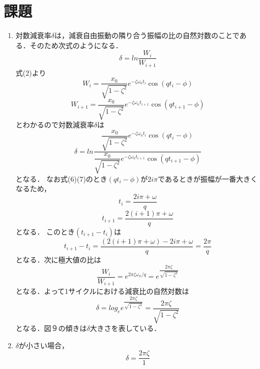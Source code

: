 \documentclass[a4paper,10.5pt]{jsarticle}
\begin{document}
\section{課題}
\begin{enumerate}
  \item 
対数減衰率$\delta$は，減衰自由振動の隣り合う振幅の比の自然対数のことである．そのため次式のようになる．
\begin{equation}
  \delta = {ln\dfrac{W_i}{W_{i+1}}}
\end{equation}
式(2)より
\begin{equation}
  W_i = {\dfrac{x_0}{\sqrt{1-\zeta^2}}e^{-\zeta {\omega}_{n} t_i}\cos (qt_i-\phi)}
\end{equation}
\begin{equation}
  W_{i+1} = {\dfrac{x_0}{\sqrt{1-\zeta^2}}e^{-\zeta {\omega}_{n} t_{i+1}}\cos (qt_{i+1}-\phi)}
\end{equation}
とわかるので対数減衰率$\delta$は
\begin{equation}
  \delta = ln{\dfrac{\dfrac{x_0}{\sqrt{1-\zeta^2}}e^{-\zeta {\omega}_{n} t_i}\cos (qt_i-\phi)}{\dfrac{x_0}{\sqrt{1-\zeta^2}}e^{-\zeta {\omega}_{n} t_{i+1}}\cos (qt_{i+1}-\phi)}}
\end{equation}
となる．
なお式(6)(7)のとき$(qt_{i}-\phi)$が$2i\pi$であるときが振幅が一番大きくなるため，
\begin{equation}
  t_i = {\dfrac{2i\pi+\omega}{q}}
\end{equation}
\begin{equation}
  t_{i+1} = {\dfrac{2(i+1)\pi+\omega}{q}}
\end{equation}
となる．
このとき$(t_{i+1}-t_{i})$は
\begin{equation}
  t_{i+1}-t_{i} = {\dfrac{(2(i+1)\pi+\omega)-2i\pi+\omega}{q}} = {\dfrac{2\pi}{q}}
\end{equation}
となる．次に極大値の比は
\begin{equation}
  {\dfrac{W_i}{W_{i+1}}} = e^{{2\pi\zeta\omega_n}/q} = e^{\dfrac{2\pi\zeta}{\sqrt{1-\zeta^2}}}
\end{equation}
となる．よって1サイクルにおける減衰比の自然対数は
\begin{equation}
  \delta = log_e{e^{\dfrac{2\pi\zeta}{\sqrt{1-\zeta^2}}}} = {\dfrac{2\pi\zeta}{\sqrt{1-\zeta^2}}}
\end{equation}
となる．図９の傾きは$\delta$大きさを表している．
  \item $\delta$が小さい場合，
  \begin{equation}
    \delta = {\dfrac{2\pi\zeta}{{1}}}
  \end{equation}

\end{enumerate}
\end{document}
